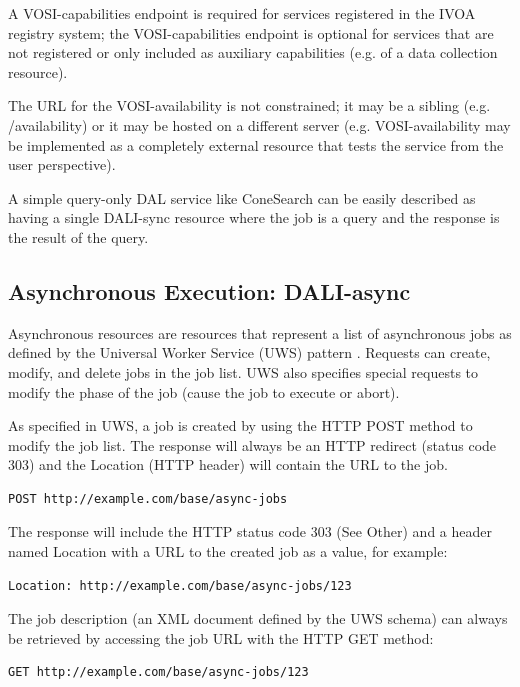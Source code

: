 \documentclass[11pt,letter]{ivoa}
\begin{document}
A VOSI-capabilities endpoint is required for services registered in the IVOA registry system;
the VOSI-capabilities endpoint is optional for services that are not registered
or only included as auxiliary capabilities (e.g. of a data collection resource).

The URL for the VOSI-availability is not constrained; it may be a sibling (e.g. /availability) 
or it may be hosted on a different server (e.g. VOSI-availability may be implemented as a 
completely external resource that tests the service from the user perspective).

A simple query-only DAL service like ConeSearch can be easily described as 
having a single DALI-sync resource where the job is a query and the response is 
the result of the query. 

\subsection{Asynchronous Execution: DALI-async}
\label{sec:dali-async}
Asynchronous resources are resources that represent a list of asynchronous jobs 
as defined by the Universal Worker Service (UWS) pattern \citep{2016ivoa.spec.1024H}. 
Requests can 
create, modify, and delete jobs in the job list. UWS also specifies special 
requests to modify the phase of the job (cause the job to execute or abort).

As specified in UWS, a job is created by using the HTTP POST method to modify 
the job list. The response will always be an HTTP redirect (status code 303) and 
the Location (HTTP header) will contain the URL to the job.

\begin{verbatim}
POST http://example.com/base/async-jobs
\end{verbatim}

The response will include the HTTP status code 303 (See Other) and a header 
named Location with a URL to the created job as a value, for example:

\begin{verbatim}
Location: http://example.com/base/async-jobs/123
\end{verbatim}

The job description (an XML document defined by the UWS schema) can always be 
retrieved by accessing the job URL with the HTTP GET method:

\begin{verbatim}
GET http://example.com/base/async-jobs/123
\end{verbatim}
\end{document}
